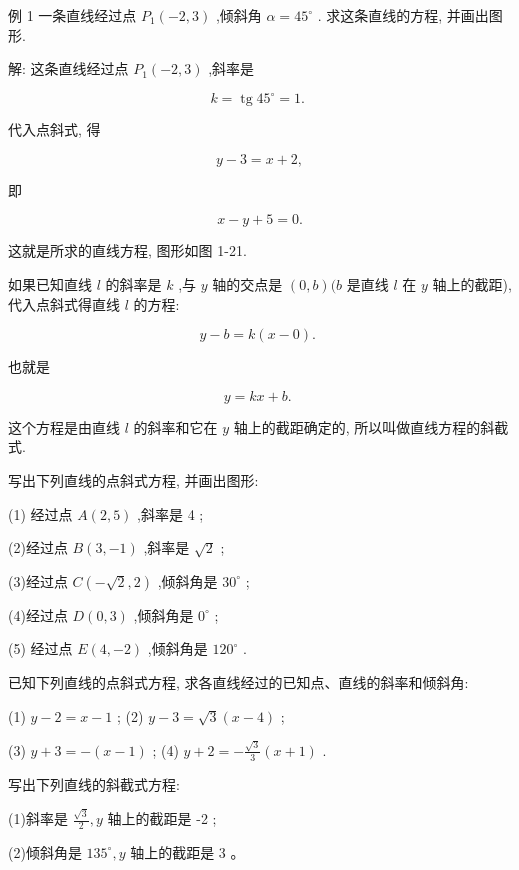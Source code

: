 \documentclass[lang=cn,newtx,10.5pt,scheme=chinese]{elegantbook}
\begin{document}
例 1 一条直线经过点 \({P}_{1}\left( {-2,3}\right)\) ,倾斜角 \(\alpha = {45}^{ \circ }\) . 求这条直线的方程, 并画出图形.

解: 这条直线经过点 \({P}_{1}\left( {-2,3}\right)\) ,斜率是

\[
  k = \operatorname{tg}{45}^{ \circ } = 1\text{. }
\]

代入点斜式, 得

\[
  y - 3 = x + 2,
\]

即

\[
  x - y + 5 = 0.
\]

这就是所求的直线方程, 图形如图 1-21.

如果已知直线 \(l\) 的斜率是 \(k\) ,与 \(y\) 轴的交点是 \(\left( {0,b}\right) (b\) 是直线 \(l\) 在 \(y\) 轴上的截距),代入点斜式得直线 \(l\) 的方程:

\[
  y - b = k\left( {x - 0}\right) \text{. }
\]

也就是
\begin{corollary}[斜截式]
\[
  y = {kx} + b\text{. }
\]
\end{corollary}
这个方程是由直线 \(l\) 的斜率和它在 \(y\) 轴上的截距确定的, 所以叫做直线方程的斜截式.

\begin{problemset}[练习]

\item 写出下列直线的点斜式方程, 并画出图形:

(1) 经过点 \(A\left( {2,5}\right)\) ,斜率是 4 ;

(2)经过点 \(B\left( {3, - 1}\right)\) ,斜率是 \(\sqrt{2}\) ;

(3)经过点 \(C\left( {-\sqrt{2},2}\right)\) ,倾斜角是 \({30}^{ \circ }\) ;

(4)经过点 \(D\left( {0,3}\right)\) ,倾斜角是 \({0}^{ \circ }\) ;

(5) 经过点 \(E\left( {4, - 2}\right)\) ,倾斜角是 \({120}^{ \circ }\) .

\item 已知下列直线的点斜式方程, 求各直线经过的已知点、直线的斜率和倾斜角:


(1) \(y - 2 = x - 1\) ; (2) \(y - 3 = \sqrt{3}\left( {x - 4}\right)\) ;


(3) \(y + 3 = - \left( {x - 1}\right)\) ; (4) \(y + 2 = - \frac{\sqrt{3}}{3}\left( {x + 1}\right)\) .

\item 写出下列直线的斜截式方程:

(1)斜率是 \(\frac{\sqrt{3}}{2},y\) 轴上的截距是 -2 ;

(2)倾斜角是 \({135}^{ \circ },y\) 轴上的截距是 3 。
\end{problemset}
\end{document}
